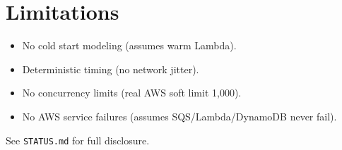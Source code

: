 \section{Limitations}

\begin{itemize}
    \item No cold start modeling (assumes warm Lambda).
    \item Deterministic timing (no network jitter).
    \item No concurrency limits (real AWS soft limit 1,000).
    \item No AWS service failures (assumes SQS/Lambda/DynamoDB never fail).
\end{itemize}

See \texttt{STATUS.md} for full disclosure.

